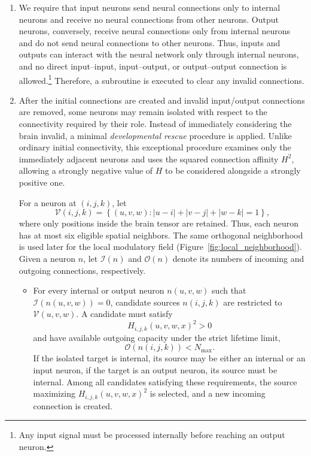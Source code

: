\documentclass[12pt,a4paper]{article}
\begin{document}
\begin{enumerate}
	These degree requirements are evaluated \emph{before} the subsequent removal of role-incompatible connections. After selecting all roles, the ordinary input/output connection restrictions and validity checks are applied as described below. Consequently, the provisional two-connection requirement does not assert that two connections necessarily survive role filtering. Selecting a prime gap avoids certain regular alignments of the linear indices with tensor dimensions, but it does not mathematically guarantee any minimum spatial separation or absence of redundant connections.

	\item We require that input neurons send neural connections only to internal neurons and receive no neural connections from other neurons. Output neurons, conversely, receive neural connections only from internal neurons and do not send neural connections to other neurons. Thus, inputs and outputs can interact with the neural network only through internal neurons, and no direct input--input, input--output, or output--output connection is allowed.\footnote{Any input signal must be processed internally before reaching an output neuron.} Therefore, a subroutine is executed to clear any invalid connections. 	
	
	\item After the initial connections are created and invalid input/output connections are removed, some neurons may remain isolated with respect to the connectivity required by their role. Instead of immediately considering the brain invalid, a minimal \emph{developmental rescue} procedure is applied. Unlike ordinary initial connectivity, this exceptional procedure examines only the immediately adjacent neurons and uses the squared connection affinity $H^2$, allowing a strongly negative value of $H$ to be considered alongside a strongly positive one.

	For a neuron at $(i,j,k)$, let
	$$\mathcal{V}(i,j,k)=\left\{(u,v,w): |u-i|+|v-j|+|w-k|=1\right\},$$
	where only positions inside the brain tensor are retained. Thus, each neuron has at most six eligible spatial neighbors. The same orthogonal neighborhood is used later for the local modulatory field (Figure~\ref{fig:local_neighborhood}). Given a neuron $n$, let $\mathcal{I}(n)$ and $\mathcal{O}(n)$ denote its numbers of incoming and outgoing connections, respectively.

	\begin{itemize}
		\item For every internal or output neuron $n(u,v,w)$ such that $\mathcal{I}(n(u,v,w))=0$, candidate sources $n(i,j,k)$ are restricted to $\mathcal{V}(u,v,w)$. A candidate must satisfy
		$$H_{i,j,k}(u,v,w,x)^2>0$$
		and have available outgoing capacity under the strict lifetime limit,
		$$\mathcal{O}(n(i,j,k))<N_{\max}.$$
		If the isolated target is internal, its source may be either an internal or an input neuron, if the target is an output neuron, its source must be internal. Among all candidates satisfying these requirements, the source maximizing $H_{i,j,k}(u,v,w,x)^2$ is selected, and a new incoming connection is created.


\end{itemize}
\end{enumerate}
\end{document}
